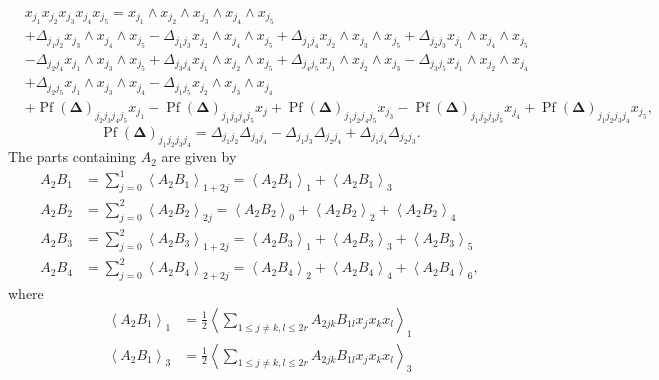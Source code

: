 \documentclass[aps,preprint]{revtex4}%
\begin{document}
\begin{align}
&  x_{j_{1}}x_{j_{2}}x_{j_{3}}x_{j_{4}}x_{j_{5}}=x_{j_{1}}\wedge x_{j_{2}%
}\wedge x_{j_{3}}\wedge x_{j_{4}}\wedge x_{j_{5}}\nonumber\\
&  +\Delta_{j_{1}j_{2}}x_{j_{3}}\wedge x_{j_{4}}\wedge x_{j_{5}}-\Delta
_{j_{1}j_{3}}x_{j_{2}}\wedge x_{j_{4}}\wedge x_{j_{5}}+\Delta_{j_{1}j_{4}%
}x_{j_{2}}\wedge x_{j_{3}}\wedge x_{j_{5}}+\Delta_{j_{2}j_{3}}x_{j_{1}}\wedge
x_{j_{4}}\wedge x_{j_{5}}\nonumber\\
&  -\Delta_{j_{2}j_{4}}x_{j_{1}}\wedge x_{j_{3}}\wedge x_{j_{5}}+\Delta
_{j_{3}j_{4}}x_{j_{1}}\wedge x_{j_{2}}\wedge x_{j_{5}}+\Delta_{j_{4}j_{5}%
}x_{j_{1}}\wedge x_{j_{2}}\wedge x_{j_{3}}-\Delta_{j_{3}j_{5}}x_{j_{1}}\wedge
x_{j_{2}}\wedge x_{j_{4}}\nonumber\\
&  +\Delta_{j_{2}j_{5}}x_{j_{1}}\wedge x_{j_{3}}\wedge x_{j_{4}}-\Delta
_{j_{1}j_{5}}x_{j_{2}}\wedge x_{j_{3}}\wedge x_{j_{4}}\nonumber\\
&  +\operatorname*{Pf}\left(  \mathbf{\Delta}\right)  _{j_{2}j_{3}j_{4}j_{5}%
}x_{j_{1}}-\operatorname*{Pf}\left(  \mathbf{\Delta}\right)  _{j_{1}j_{3}%
j_{4}j_{5}}x_{j}+\operatorname*{Pf}\left(  \mathbf{\Delta}\right)
_{j_{1}j_{2}j_{4}j_{5}}x_{j_{3}}-\operatorname*{Pf}\left(  \mathbf{\Delta
}\right)  _{j_{1}j_{2}j_{3}j_{5}}x_{j_{4}}+\operatorname*{Pf}\left(
\mathbf{\Delta}\right)  _{j_{1}j_{2}j_{3}j_{4}}x_{j_{5}},
\end{align}%
\begin{equation}
\operatorname*{Pf}\left(  \mathbf{\Delta}\right)  _{j_{1}j_{2}j_{3}j_{4}%
}=\Delta_{j_{1}j_{2}}\Delta_{j_{3}j_{4}}-\Delta_{j_{1}j_{3}}\Delta_{j_{2}%
j_{4}}+\Delta_{j_{1}j_{4}}\Delta_{j_{2}j_{3}}.
\end{equation}
The parts containing $A_{2}$ are given by
\begin{align}
A_{2}B_{1}  &  =\sum_{j=0}^{1}\left\langle A_{2}B_{1}\right\rangle
_{1+2j}=\left\langle A_{2}B_{1}\right\rangle _{1}+\left\langle A_{2}%
B_{1}\right\rangle _{3}\\
A_{2}B_{2}  &  =\sum_{j=0}^{2}\left\langle A_{2}B_{2}\right\rangle
_{2j}=\left\langle A_{2}B_{2}\right\rangle _{0}+\left\langle A_{2}%
B_{2}\right\rangle _{2}+\left\langle A_{2}B_{2}\right\rangle _{4}\\
A_{2}B_{3}  &  =\sum_{j=0}^{2}\left\langle A_{2}B_{3}\right\rangle
_{1+2j}=\left\langle A_{2}B_{3}\right\rangle _{1}+\left\langle A_{2}%
B_{3}\right\rangle _{3}+\left\langle A_{2}B_{3}\right\rangle _{5}\\
A_{2}B_{4}  &  =\sum_{j=0}^{2}\left\langle A_{2}B_{4}\right\rangle
_{2+2j}=\left\langle A_{2}B_{4}\right\rangle _{2}+\left\langle A_{2}%
B_{4}\right\rangle _{4}+\left\langle A_{2}B_{4}\right\rangle _{6},
\end{align}
where
\begin{align}
\left\langle A_{2}B_{1}\right\rangle _{1}  &  =\frac{1}{2}\left\langle
\sum_{1\leq j\neq k,l\leq2r}A_{2jk}B_{1l}x_{j}x_{k}x_{l}\right\rangle _{1}\\
\left\langle A_{2}B_{1}\right\rangle _{3}  &  =\frac{1}{2}\left\langle
\sum_{1\leq j\neq k,l\leq2r}A_{2jk}B_{1l}x_{j}x_{k}x_{l}\right\rangle _{3}%
\end{align}
%
\end{document}
